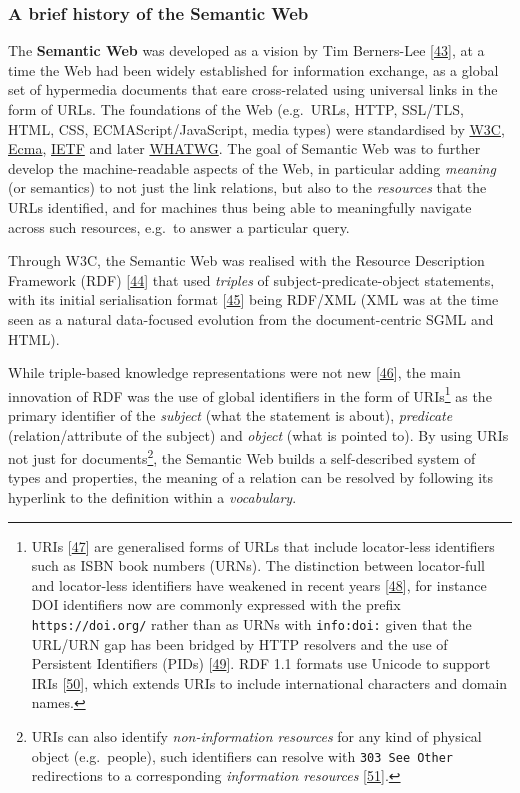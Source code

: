 \hypertarget{sec:semweb}{%
\subsubsection{A brief history of the Semantic Web}\label{sec:semweb}}

The \textbf{Semantic Web} was developed as a vision by Tim Berners-Lee {[}\protect\hyperlink{ref-Guy7cjVY}{43}{]}, at a time the Web had been widely established for information exchange, as a global set of hypermedia documents that eare cross-related using universal links in the form of URLs. The foundations of the Web (e.g.~URLs, HTTP, SSL/TLS, HTML, CSS, ECMAScript/JavaScript, media types) were standardised by \href{https://www.w3.org/standards/}{W3C}, \href{https://www.ecma-international.org/}{Ecma}, \href{https://www.ietf.org/standards/}{IETF} and later \href{https://whatwg.org/}{WHATWG}. The goal of Semantic Web was to further develop the machine-readable aspects of the Web, in particular adding \emph{meaning} (or semantics) to not just the link relations, but also to the \emph{resources} that the URLs identified, and for machines thus being able to meaningfully navigate across such resources, e.g.~to answer a particular query.

Through W3C, the Semantic Web was realised with the Resource Description Framework (RDF) {[}\protect\hyperlink{ref-16WGmCih8}{44}{]} that used \emph{triples} of subject-predicate-object statements, with its initial serialisation format {[}\protect\hyperlink{ref-16wvFH4nh}{45}{]} being RDF/XML (XML was at the time seen as a natural data-focused evolution from the document-centric SGML and HTML).

While triple-based knowledge representations were not new {[}\protect\hyperlink{ref-NxvhwSmG}{46}{]}, the main innovation of RDF was the use of global identifiers in the form of URIs\footnote{URIs {[}\protect\hyperlink{ref-RRtwPF7Y}{47}{]} are generalised forms of URLs that include locator-less identifiers
  such as ISBN book numbers (URNs). The distinction between locator-full and locator-less identifiers have weakened in recent years {[}\protect\hyperlink{ref-nW4HY8Nq}{48}{]}, for instance DOI identifiers now are commonly expressed with the prefix \texttt{https://doi.org/} rather than as URNs with \texttt{info:doi:} given that the URL/URN gap has been bridged by HTTP resolvers and the use of Persistent Identifiers (PIDs) {[}\protect\hyperlink{ref-HqZ3r6J3}{49}{]}. RDF 1.1 formats use Unicode to support IRIs {[}\protect\hyperlink{ref-rqjuXkEf}{50}{]}, which extends URIs to include international characters and domain names.} as the primary identifier of the \emph{subject} (what the statement is about), \emph{predicate} (relation/attribute of the subject) and \emph{object} (what is pointed to). By using URIs not just for documents\footnote{URIs can also identify \emph{non-information resources} for any kind of physical object (e.g.~people), such identifiers can resolve with \texttt{303\ See\ Other} redirections to a corresponding \emph{information resources} {[}\protect\hyperlink{ref-rnzJ4khD}{51}{]}.}, the Semantic Web builds a self-described system of types and properties, the meaning of a relation can be resolved by following its hyperlink to the definition within a \emph{vocabulary}.

